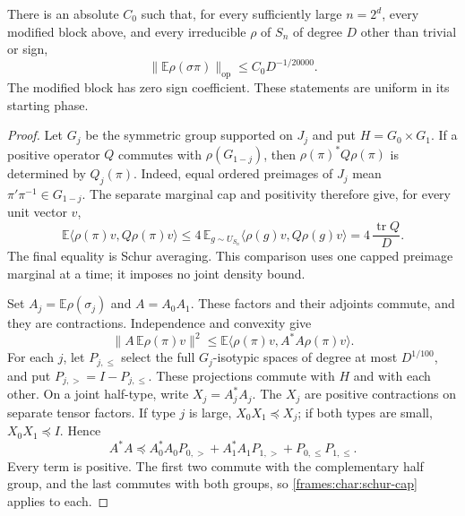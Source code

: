 \begin{proposition}\label{frames:char:block-norm}
There is an absolute $C_0$ such that, for every sufficiently large
$n=2^d$, every modified block above, and every irreducible $\rho$ of
$S_n$ of degree $D$ other than trivial or sign,
\[
 \|\mathbb E\rho(\sigma\pi)\|_{\mathrm{op}}
 \le C_0D^{-1/20000}.
\]
The modified block has zero sign coefficient. These statements are
uniform in its starting phase.
\end{proposition}

\begin{proof}
Let $G_j$ be the symmetric group supported on $J_j$ and put
$H=G_0\times G_1$. If a positive operator $Q$ commutes with
$\rho(G_{1-j})$, then $\rho(\pi)^*Q\rho(\pi)$ is determined by
$Q_j(\pi)$. Indeed, equal ordered preimages of $J_j$ mean
$\pi'\pi^{-1}\in G_{1-j}$. The separate marginal cap and positivity
therefore give, for every unit vector $v$,
\begin{equation}\label{frames:char:schur-cap}
 \mathbb E\langle\rho(\pi)v,Q\rho(\pi)v\rangle
 \le4\,\mathbb E_{g\sim U_{S_n}}
       \langle\rho(g)v,Q\rho(g)v\rangle
 =4\,\frac{\operatorname{tr}Q}{D}.
\end{equation}
The final equality is Schur averaging. This comparison uses one capped
preimage marginal at a time; it imposes no joint density bound.

Set $A_j=\mathbb E\rho(\sigma_j)$ and $A=A_0A_1$. These factors and
their adjoints commute, and they are contractions. Independence and
convexity give
\begin{equation}\label{frames:char:convexity}
 \|A\,\mathbb E\rho(\pi)v\|^2
 \le\mathbb E\langle\rho(\pi)v,A^*A\rho(\pi)v\rangle.
\end{equation}
For each $j$, let $P_{j,\le}$ select the full $G_j$-isotypic spaces
of degree at most $D^{1/100}$, and put $P_{j,>}=I-P_{j,\le}$.
These projections commute with $H$ and with each other. On a joint
half-type, write $X_j=A_j^*A_j$. The $X_j$ are positive contractions
on separate tensor factors. If type $j$ is large, $X_0X_1\preceq X_j$;
if both types are small, $X_0X_1\preceq I$. Hence
\begin{equation}\label{frames:char:positive-comparison}
 A^*A\preceq
 A_0^*A_0P_{0,>}+A_1^*A_1P_{1,>}+P_{0,\le}P_{1,\le}.
\end{equation}
Every term is positive. The first two commute with the complementary
half group, and the last commutes with both groups, so
\eqref{frames:char:schur-cap} applies to each.


\end{proof}
